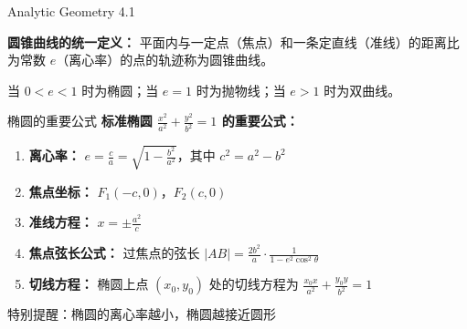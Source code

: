 \documentclass{ctexart}
\newcommand{\highlight}[1]{\colorbox{sunsityellow!20}{\ensuremath{#1}}}
\begin{document}
\thispagestyle{fancy}

\begin{center}
    \begin{chaptertitle}{\faBookOpen}{Analytic Geometry 4.1}
    \end{chaptertitle}
\end{center}


\begin{theorembox}{4.1}
\textbf{圆锥曲线的统一定义：} 平面内与一定点（焦点）和一条定直线（准线）的距离比为常数 $e$（离心率）的点的轨迹称为圆锥曲线。

当 $0 < e < 1$ 时为椭圆；当 $e = 1$ 时为抛物线；当 $e > 1$ 时为双曲线。
\end{theorembox}

\begin{formulabox}{椭圆的重要公式}
\textbf{标准椭圆 $\frac{x^2}{a^2} + \frac{y^2}{b^2} = 1$ 的重要公式：}

\begin{enumerate}[leftmargin=15pt, itemsep=6pt]
    \item \textbf{离心率：} $e = \frac{c}{a} = \sqrt{1 - \frac{b^2}{a^2}}$，其中 $c^2 = a^2 - b^2$
    
    \item \textbf{焦点坐标：} $F_1(-c, 0)$，$F_2(c, 0)$
    
    \item \textbf{准线方程：} $x = \pm\frac{a^2}{c}$
    
    \item \textbf{焦点弦长公式：} 过焦点的弦长 $|AB| = \frac{2b^2}{a} \cdot \frac{1}{1 - e^2\cos^2\theta}$
    
    \item \textbf{切线方程：} 椭圆上点 $(x_0, y_0)$ 处的切线方程为 $\frac{x_0 x}{a^2} + \frac{y_0 y}{b^2} = 1$
\end{enumerate}

\highlight{\text{特别提醒：椭圆的离心率越小，椭圆越接近圆形}}
\end{formulabox}
\end{document}
